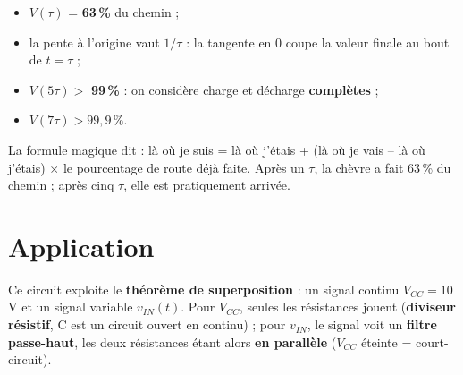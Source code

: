 \begin{propbox}[title={La constante de temps $\tau = RC$}]
\begin{itemize}
  \item $V(\tau)$ = \textbf{63\,\%} du chemin ;
  \item la pente à l'origine vaut $1/\tau$ : la tangente en 0 coupe la valeur finale au bout
        de $t = \tau$ ;
  \item $V(5\tau) > $ \textbf{99\,\%} : on considère charge et décharge \textbf{complètes} ;
  \item $V(7\tau) > 99{,}9\,\%$.
\end{itemize}
\end{propbox}

\begin{goatbox}
La formule magique dit : \og là où je suis = là où j'étais + (là où je vais -- là où
j'étais) $\times$ le pourcentage de route déjà faite\fg{}. Après un $\tau$, la chèvre a fait
63\,\% du chemin ; après cinq $\tau$, elle est pratiquement arrivée.
\end{goatbox}

\section{Application}


\begin{rembox}[title=Ce que dit le cours]
Ce circuit exploite le \textbf{théorème de superposition} : un signal continu $V_{CC} = 10$\,V
et un signal variable $v_{IN}(t)$. Pour $V_{CC}$, seules les résistances jouent
(\textbf{diviseur résistif}, C est un circuit ouvert en continu) ; pour $v_{IN}$, le signal
voit un \textbf{filtre passe-haut}, les deux résistances étant alors \textbf{en parallèle}
($V_{CC}$ éteinte = court-circuit).
\end{rembox}

